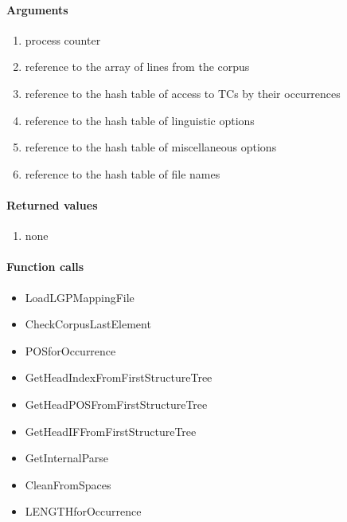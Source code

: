 \paragraph{Arguments}
\begin{enumerate}
\item process counter
\item reference to the array of lines from the corpus
\item reference to the hash table of access to TCs by their occurrences
\item reference to the hash table of linguistic options
\item reference to the hash table of miscellaneous options
\item reference to the hash table of file names
\end{enumerate}

\paragraph{Returned values}
\begin{enumerate}
\item none
\end{enumerate}

\paragraph{Function calls}
\begin{itemize}
\item LoadLGPMappingFile
\item CheckCorpusLastElement
\item POSforOccurrence
\item GetHeadIndexFromFirstStructureTree
\item GetHeadPOSFromFirstStructureTree
\item GetHeadIFFromFirstStructureTree
\item GetInternalParse
\item CleanFromSpaces
\item LENGTHforOccurrence
\end{itemize}

